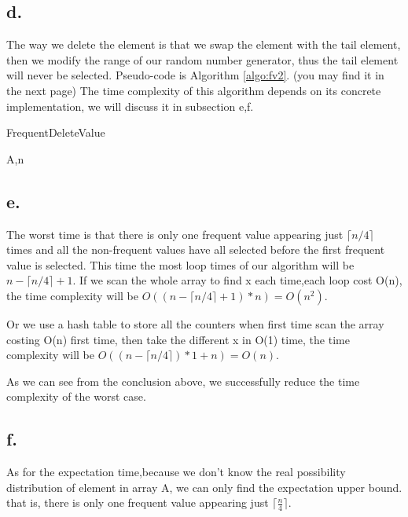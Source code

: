 \documentclass[oneside]{homework} %
\begin{document}
\subsection*{d.}
The way we delete the element is that we swap the element with the tail element, then we modify the range of our random number generator, thus the tail element will never be selected. Pseudo-code is Algorithm \ref{algo:fv2}. (you may find it in the next page)
The time complexity of this algorithm depends on its concrete implementation, we will discuss it in subsection e,f.

\begin{algorithm}[h]
  \caption{FrequentDeleteValue}
  \label{algo:fv2}
  \begin{algorithmic}[1]
	\REQUIRE A,n
	\ENSURE ~ ~\\ 
	  \ELSE
	  \ENDIF
	\ENDWHILE
  \end{algorithmic}
\end{algorithm} 

\subsection*{e.}

The worst time is that there is only one frequent value appearing just $\lceil n/4 \rceil$ times and all the non-frequent values have all selected before the first frequent value is selected.
This time the most loop times of our algorithm will be $n - \lceil n/4 \rceil +1 $. If we scan the whole array to find x each time,each loop cost O(n), the time complexity will be $O((n - \lceil n/4 \rceil +1)*n) = O(n^{2})$. 

Or we use a hash table to store all the counters when first time scan the array costing O(n) first time, then take the different x in O(1) time, the time complexity will be $O((n - \lceil n/4 \rceil)*1 +n) = O(n)$.

As we can see from the conclusion above, we successfully reduce the time complexity of the worst case.

\subsection*{f.}
As for the expectation time,because we don't know the real possibility distribution of element in array A, we can only find the expectation upper bound. that is, there is only one frequent value appearing just $\lceil \frac{n}{4} \rceil$.
\end{document}
